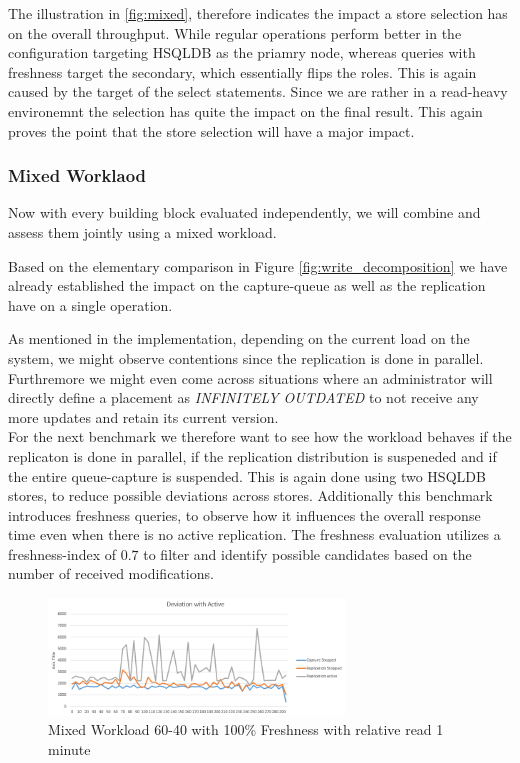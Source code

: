 The illustration in \ref{fig:mixed}, therefore indicates the impact a store selection has on the overall throughput.
While regular operations perform better in the configuration targeting HSQLDB as the priamry node,
whereas queries with freshness target the secondary, which essentially flips the roles.
This is again caused by the target of the select statements. 
Since we are rather in a read-heavy environemnt the selection has quite the impact on the final result.
This again proves the point that the store selection will have a major impact.


\subsubsection{Mixed Worklaod} 

Now with every building block evaluated independently, we will combine and assess them jointly using a mixed workload.



Based on the elementary comparison in Figure \ref{fig:write_decomposition} we have already established the impact on the capture-queue as well as the 
replication have on a single operation.

As mentioned in the implementation, depending on the current load on the system, we might observe contentions since the replication is done in parallel.
Furthremore we might even come across situations where an administrator will directly define a placement as \emph{INFINITELY OUTDATED} to not receive any more updates
and retain its current version.\\
For the next benchmark we therefore want to see how the workload behaves if the replicaton is done in parallel, if the replication distribution is suspeneded
and if the entire queue-capture is suspended.
This is again done using two HSQLDB stores, to reduce possible deviations across stores. 
Additionally this benchmark introduces freshness queries, to observe how it influences the overall response time even when there is no active replication. 
The freshness evaluation utilizes a freshness-index of $0.7$ to filter and identify possible candidates based on the number of received modifications.


\begin{figure}[t] 
    \centering 
    \includegraphics[width=0.7\textwidth]{Figures/deviation_with_active_que.PNG}
    \caption{Mixed Workload 60-40 with 100\% Freshness with relative read 1 minute }
    \label{fig:replication_impact}
\end{figure}

